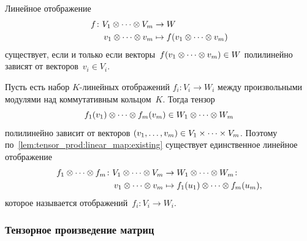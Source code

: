 \begin{lemma}
	\label{lem:tensor_prod:linear_map:existing}
	Линейное отображение
	\begin{align*}
		f \colon
		V_1 \otimes \cdots \otimes V_m
		&\to
		W
		\\
		v_1 \otimes \cdots \otimes v_m
		&\mapsto
		f(v_1 \otimes \cdots \otimes v_m)
	\end{align*}
	существует, если и только если векторы~$f(v_1 \otimes \cdots \otimes v_m) \in W$ полилинейно зависят от векторов~$v_i \in V_i$.
\end{lemma}

Пусть есть набор $K$-линейных отображений $f_i \colon V_i \to W_i$ между произвольными модулями над коммутативным кольцом~$K$. Тогда тензор
\[
	f_1(v_1) \otimes \cdots \otimes f_m(v_m)
	\in
	W_1 \otimes \cdots \otimes W_m
\]
полилинейно зависит от векторов
$
	(v_1, \dots, v_m)
	\in
	V_1 \times\cdots\times V_m
$.
Поэтому по~\cref{lem:tensor_prod:linear_map:existing} существует единственное линейное отображение
\begin{align*}
	f_1 \otimes \cdots \otimes f_m
	\colon
	V_1 \otimes \cdots \otimes V_m
	&\to
	W_1 \otimes \cdots \otimes W_m
	\colon
	\\
	v_1 \otimes \cdots \otimes v_m
	&\mapsto
	f_1(u_1)
	\otimes \cdots \otimes
	f_m(u_m)
	,
\end{align*}
которое называется  отображений~$f_i \colon V_i \to W_i$.

\subsubsection{Тензорное произведение матриц}

